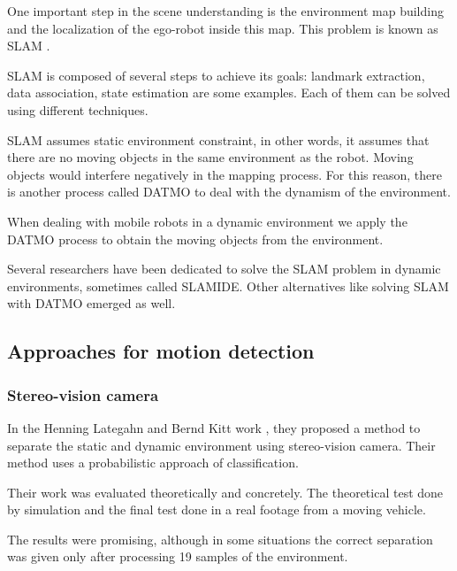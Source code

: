 One important step in the scene understanding is the environment map building and the localization of the ego-robot inside this map. This problem is known as SLAM \cite{Leonard2002Mobile, qadeerthesis}.

SLAM is composed of several steps to achieve its goals: landmark extraction, data association, state estimation are some examples. Each of them can be solved using different techniques.

SLAM assumes static environment constraint, in other words, it assumes that there are no moving objects in the same environment as the robot. Moving objects would interfere negatively in the mapping process. For this reason, there is another process called DATMO to deal with the dynamism of the environment.

When dealing with mobile robots in a dynamic environment we apply the DATMO process to obtain the moving objects from the environment.

Several researchers have been dedicated to solve the SLAM problem in dynamic environments, sometimes called SLAMIDE\cite{bibbyrss07}. Other alternatives like solving SLAM with DATMO\cite{Wang02simultaneouslocalization} emerged as well.

\subsection{Approaches for motion detection}

\subsubsection{Stereo-vision camera}

In the Henning Lategahn and Bernd Kitt work \cite{DBLP:conf/ivs/LategahnGHKE11}, they proposed a method to separate the static and dynamic environment using stereo-vision camera. Their method uses a probabilistic approach of classification. %

Their work was evaluated theoretically and concretely. The theoretical test done by simulation and the final test done in a real footage from a moving vehicle.

The results were promising, although in some situations the correct separation was given only after processing 19 samples of the environment. 

